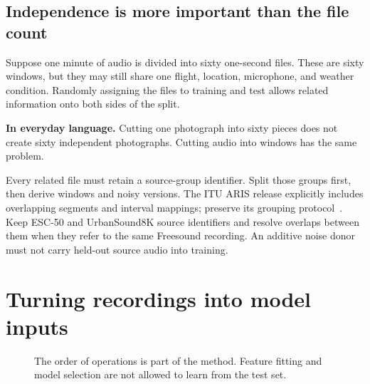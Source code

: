 \documentclass[11pt,letterpaper]{article}
\newcommand{\plain}[1]{\par\smallskip\noindent\textbf{In everyday language.} #1\par\smallskip}
\begin{document}
\subsection{Independence is more important than the file count}
Suppose one minute of audio is divided into sixty one-second files. These are
sixty windows, but they may still share one flight, location, microphone, and
weather condition. Randomly assigning the files to training and test allows
related information onto both sides of the split.

\plain{Cutting one photograph into sixty pieces does not create sixty
independent photographs. Cutting audio into windows has the same problem.}

Every related file must retain a source-group identifier. Split those groups
first, then derive windows and noisy versions. The ITU ARIS release explicitly
includes overlapping segments and interval mappings; preserve its grouping
protocol~\cite{ituaris}. Keep ESC-50 and UrbanSound8K source identifiers and
resolve overlaps between them when they refer to the same Freesound recording.
An additive noise donor must not carry held-out source audio into training.

\section{Turning recordings into model inputs}
\label{sec:processing}
\begin{figure}[htbp]
\centering
{}
\caption{The order of operations is part of the method. Feature fitting and
model selection are not allowed to learn from the test set.}
\end{figure}
\end{document}
